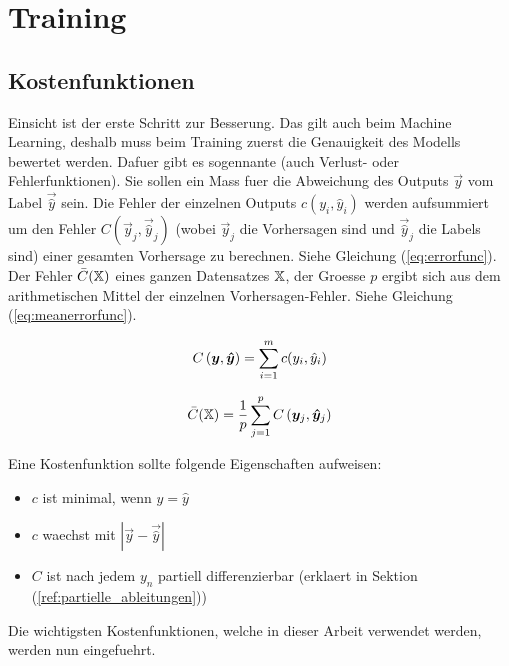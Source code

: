 \section{Training}
\subsection{Kostenfunktionen}
Einsicht ist der erste Schritt zur Besserung. Das gilt auch beim Machine Learning, deshalb muss beim Training zuerst die Genauigkeit des Modells bewertet werden.
Dafuer gibt es sogennante  (auch Verlust- oder
Fehlerfunktionen).
Sie sollen ein Mass fuer die Abweichung des Outputs $\vec{y}$ vom Label $\vec{\hat{y}}$ sein.
\para{}
Die Fehler der einzelnen Outputs $c(y_i,\hat{y}_i)$ werden aufsummiert um den
Fehler $C(\vec{y}_j,\vec{\hat{y}}_j)$ (wobei $\vec{y}_j$ die Vorhersagen sind und
$\vec{\hat{y}}_j$ die Labels sind) einer gesamten Vorhersage zu berechnen. Siehe Gleichung (\ref{eq:errorfunc}).\\
Der Fehler $\bar{C}(\mathbb{X})$ eines ganzen Datensatzes $\mathbb{X}$, der
Groesse $p$ ergibt sich aus dem arithmetischen
Mittel der einzelnen Vorhersagen-Fehler. Siehe Gleichung (\ref{eq:meanerrorfunc}).
\para{}
\begin{minipage}[h!]{0.5\textwidth}
  \centering
  \begin{equation}\label{eq:errorfunc}
    C \left(\bm{y},\bm{\hat{y}} \right)=\displaystyle\sum_{i=1}^{m} c(y_i, \hat{y}_i)
  \end{equation}
\end{minipage}
\begin{minipage}[h!]{0.5\textwidth}
  \centering
  \begin{equation}\label{eq:meanerrorfunc}
    \bar{C}(\mathbb{X}) = \frac{1}{p}\displaystyle\sum_{j=1}^{p} C\left(\bm{y}_j,\bm{\hat{y}}_j\right)
  \end{equation}
\end{minipage}
\para{}
Eine Kostenfunktion sollte folgende Eigenschaften aufweisen:
\begin{itemize}
\item{$c$ ist minimal, wenn $y = \hat{y}$}
\item{$c$ waechst mit $|\vec{y}-\vec{\hat{y}}|$}
\item{$C$ ist nach jedem $y_n$ partiell differenzierbar (erklaert in Sektion (\ref{ref:partielle_ableitungen}))}
\end{itemize}

\para{}
Die wichtigsten Kostenfunktionen, welche in dieser Arbeit verwendet werden,
werden nun eingefuehrt.

